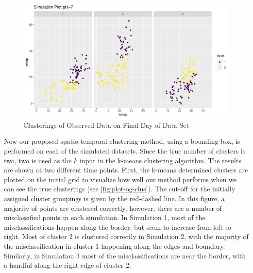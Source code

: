 \documentclass[12pt]{article}
\begin{document}
\begin{figure}[tbp]

{\centering \includegraphics[width=\linewidth,]{spatio-temporal-model-arctic-sea-ice_files/figure-latex/all-clus-1} 

}

\caption{Clusterings of Observed Data on Final Day of Data Set}\label{fig:all-clus}
\end{figure}

Now our proposed spatio-temporal clustering method, using a bounding
box, is performed on each of the simulated datasets. Since the true
number of clusters is two, two is used as the \(k\) input in the k-means
clustering algorithm. The results are shown at two different time
points. First, the k-means determined clusters are plotted on the
initial grid to visualize how well our method performs when we can see
the true clusterings (see \cref{fig:plot-og-clus}). The cut-off for the
initially assigned cluster groupings is given by the red-dashed line. In
this figure, a majority of points are clustered correctly, however,
there are a number of misclassified points in each simulation. In
Simulation 1, most of the misclassifications happen along the border,
but seem to increase from left to right. Most of cluster 2 is clustered
correctly in Simulation 2, with the majority of the misclassification in
cluster 1 happening along the edges and boundary. Similarly, in
Simulation 3 most of the misclassifications are near the border, with a
handful along the right edge of cluster 2.
\end{document}
